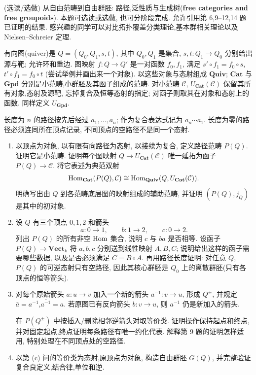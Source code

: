 \documentclass{article}
\begin{document}
\begin{problem}
  (选读/选做) {\heiti 从自由范畴到自由群胚: 路径,泛性质与生成树}(\textbf{free categories and free groupoids}). 本题可选读或选做, 也可分阶段完成. 允许引用第 6,9--12,14 题已证明的结果. 感兴趣的同学可以对比拓扑覆盖分类理论,基本群相关理论以及 Nielsen--Schreier 定理.

  有向图(quiver)是 $Q=(Q_0,Q_1,s,t)$, 其中 $Q_0,Q_1$ 是集合, $s,t:Q_1\to Q_0$ 分别给出源与靶; 允许环和重边. 图映射 $f:Q\to Q'$ 是一对函数 $f_0,f_1$, 满足 $s'\circ f_1=f_0\circ s$,$t'\circ f_1=f_0\circ t$ (尝试举例并画出来一个对象). 以这些对象与态射组成 $\mathbf{Quiv}$; $\mathbf{Cat}$ 与 $\mathbf{Gpd}$ 分别是小范畴,小群胚及其函子组成的范畴. 对小范畴 $\mathcal C$, $U_{\mathbf{Cat}}(\mathcal C)$ 保留其所有对象,态射及源靶, 忘掉复合及恒等态射的指定; 对函子则取其在对象和态射上的函数. 同样定义 $U_{\mathbf{Gpd}}$.

  长度为 $n$ 的路径按先后经过 $a_1,\ldots,a_n$; 作为复合表达式记为 $a_n\cdots a_1$. 长度为零的路径必须连同所在顶点记录, 不同顶点的空路径不是同一个态射.

  \begin{enumerate}
    \item[(a)] 以顶点为对象, 以有限有向路径为态射, 以接续为复合, 定义路径范畴 $P(Q)$. 证明它是小范畴. 证明每个图映射 $Q\to U_{\mathbf{Cat}}(\mathcal C)$ 唯一延拓为函子 $P(Q)\to\mathcal C$. 将它表述为典范双射
      \[
        \operatorname{Hom}_{\mathbf{Cat}}(P(Q),\mathcal C)
        \cong\operatorname{Hom}_{\mathbf{Quiv}}(Q,U_{\mathbf{Cat}}(\mathcal C)).
      \]
      明确写出由 $Q$ 到各范畴底层图的映射组成的辅助范畴, 并证明 $(P(Q),j_Q)$ 是其中的初对象.
    \item[(b)] 设 $Q$ 有三个顶点 $0,1,2$ 和箭头
      \[
        a:0\to1,\qquad b:1\to2,\qquad c:0\to2.
      \]
      列出 $P(Q)$ 的所有非空 $\operatorname{Hom}$ 集合, 说明 $c$ 与 $ba$ 是否相等. 设函子 $P(Q)\to\mathbf{Vect}_k$ 将 $a,b,c$ 分别送到线性映射 $A,B,C$; 说明给出这样的函子需要哪些数据, 以及是否必须满足 $C=B\circ A$. 再用路径长度证明: 对任意 $Q$, $P(Q)$ 的可逆态射只有空路径, 因此其核心群胚是 $Q_0$ 上的离散群胚(只有各顶点的恒等箭头).
    \item[(c)] 对每个原始箭头 $a:u\to v$ 加入一个新的箭头 $a^{-1}:v\to u$, 形成 $Q^\pm$, 并规定 $\bar a=a^{-1}$,$\overline{a^{-1}}=a$. 若原图已有反向箭头 $b:v\to u$, 则 $a^{-1}$ 仍是新加入的箭头.

      在 $P(Q^\pm)$ 中按插入/删除相邻逆箭头对取等价类. 证明操作保持起点和终点, 并对固定起点,终点证明每条路径有唯一约化代表. 解释第 9 题的证明怎样适用, 特别处理在不同顶点处的空路径.
    \item[(d)] 以第 (c) 问的等价类为态射,原顶点为对象, 构造自由群胚 $G(Q)$, 并完整验证复合良定义,结合律,单位和逆.


\end{enumerate}
\end{problem}
\end{document}
